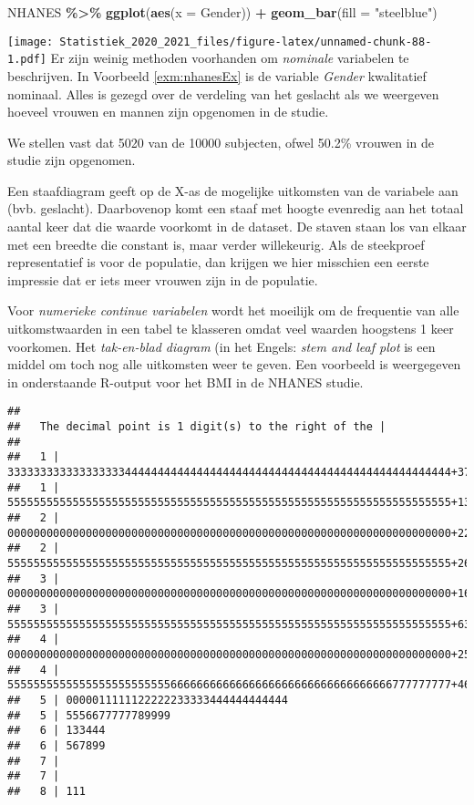 \documentclass[
  12pt,dutch,coursenotes]{book}
\newenvironment{Shaded}{\begin{snugshade}}{\end{snugshade}}
\newcommand{\DataTypeTok}[1]{\textcolor[rgb]{0.13,0.29,0.53}{#1}}
\newcommand{\KeywordTok}[1]{\textcolor[rgb]{0.13,0.29,0.53}{\textbf{#1}}}
\newcommand{\NormalTok}[1]{#1}
\newcommand{\OperatorTok}[1]{\textcolor[rgb]{0.81,0.36,0.00}{\textbf{#1}}}
\newcommand{\StringTok}[1]{\textcolor[rgb]{0.31,0.60,0.02}{#1}}
\theoremstyle{definition}
\theoremstyle{definition}
\theoremstyle{definition}
\theoremstyle{remark}
\begin{document}
\begin{Shaded}
\begin{Highlighting}[]
\NormalTok{NHANES }\OperatorTok{\%\textgreater{}\%}\StringTok{ }\KeywordTok{ggplot}\NormalTok{(}\KeywordTok{aes}\NormalTok{(}\DataTypeTok{x =}\NormalTok{ Gender)) }\OperatorTok{+}\StringTok{ }\KeywordTok{geom\_bar}\NormalTok{(}\DataTypeTok{fill =} \StringTok{"steelblue"}\NormalTok{)}
\end{Highlighting}
\end{Shaded}

\texttt{[image: Statistiek\_2020\_2021\_files/figure-latex/unnamed-chunk-88-1.pdf]}
Er zijn weinig methoden voorhanden om \emph{nominale} variabelen te
beschrijven. In Voorbeeld \ref{exm:nhanesEx} is de variable \emph{Gender}
kwalitatief nominaal.
Alles is gezegd over de verdeling van het geslacht als we weergeven hoeveel vrouwen en mannen zijn opgenomen in de studie.

We stellen vast dat 5020 van de 10000 subjecten, ofwel 50.2\% vrouwen in de studie zijn opgenomen.

Een staafdiagram geeft op de X-as de mogelijke uitkomsten van de variabele
aan (bvb. geslacht). Daarbovenop komt een staaf met hoogte evenredig aan
het totaal aantal keer dat die waarde voorkomt in de dataset. De staven staan los van elkaar met een breedte die constant is, maar verder willekeurig. Als de steekproef
representatief is voor de populatie, dan
krijgen we hier misschien een eerste impressie dat er iets meer vrouwen zijn in de populatie.

Voor \emph{numerieke continue variabelen} wordt het moeilijk om de
frequentie van alle uitkomstwaarden in een tabel te klasseren omdat veel
waarden hoogstens 1 keer voorkomen. Het \emph{tak-en-blad diagram} (in het
Engels: \emph{stem and leaf plot} is een middel om toch nog alle
uitkomsten weer te geven. Een voorbeeld is weergegeven in onderstaande R-output voor het BMI in de NHANES studie.

\begin{Shaded}
\end{Shaded}

\begin{verbatim}
## 
##   The decimal point is 1 digit(s) to the right of the |
## 
##   1 | 33333333333333333344444444444444444444444444444444444444444444444444+37
##   1 | 55555555555555555555555555555555555555555555555555555555555555555555+1389
##   2 | 00000000000000000000000000000000000000000000000000000000000000000000+2264
##   2 | 55555555555555555555555555555555555555555555555555555555555555555555+2610
##   3 | 00000000000000000000000000000000000000000000000000000000000000000000+1693
##   3 | 55555555555555555555555555555555555555555555555555555555555555555555+635
##   4 | 00000000000000000000000000000000000000000000000000000000000000000000+255
##   4 | 55555555555555555555555556666666666666666666666666666666666777777777+46
##   5 | 0000011111122222233333444444444444
##   5 | 5556677777789999
##   6 | 133444
##   6 | 567899
##   7 | 
##   7 | 
##   8 | 111
\end{verbatim}
\end{document}
